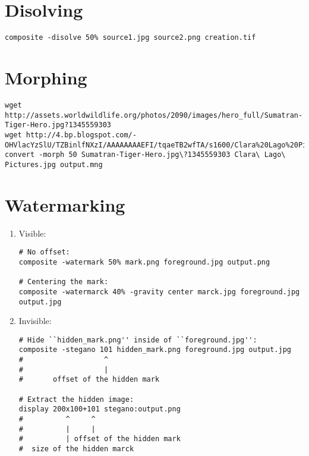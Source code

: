 
\section{Disolving}

\begin{lstlisting}
composite -disolve 50% source1.jpg source2.png creation.tif
\end{lstlisting}


\section{Morphing}

\begin{lstlisting}
wget http://assets.worldwildlife.org/photos/2090/images/hero_full/Sumatran-Tiger-Hero.jpg?1345559303
wget http://4.bp.blogspot.com/-OHVlacYzSlU/TZBinlfNXzI/AAAAAAAAEFI/tqaeTB2wfTA/s1600/Clara%20Lago%20Pictures.jpg
convert -morph 50 Sumatran-Tiger-Hero.jpg\?1345559303 Clara\ Lago\ Pictures.jpg output.mng
\end{lstlisting}


\section{Watermarking}

\begin{enumerate}

\item Visible:

\begin{lstlisting}
# No offset:
composite -watermark 50% mark.png foreground.jpg output.png

# Centering the mark:
composite -watermarck 40% -gravity center marck.jpg foreground.jpg output.jpg
\end{lstlisting}

\item Invisible:

\begin{lstlisting}
# Hide ``hidden_mark.png'' inside of ``foreground.jpg'':
composite -stegano 101 hidden_mark.png foreground.jpg output.jpg
#                   ^
#                   |
#       offset of the hidden mark

# Extract the hidden image:
display 200x100+101 stegano:output.png
#          ^     ^
#          |     |
#          | offset of the hidden mark
#  size of the hidden marck
\end{lstlisting}

\end{enumerate}

